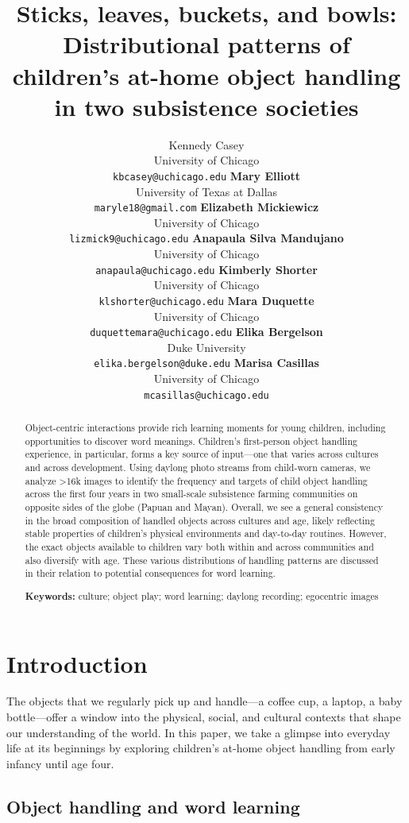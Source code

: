 \documentclass[10pt, letterpaper]{article}
\title{Sticks, leaves, buckets, and bowls: Distributional patterns of
children's at-home object handling in two subsistence societies}
\author{Kennedy Casey \\
        University of Chicago \\
        \texttt{\small{kbcasey@uchicago.edu}}
\And \textbf{Mary Elliott} \\
             University of Texas at Dallas \\
             \texttt{\small{maryle18@gmail.com}}
\And \textbf{Elizabeth Mickiewicz} \\
             University of Chicago \\
             \texttt{\small{lizmick9@uchicago.edu}}    
\And \textbf{Anapaula Silva Mandujano} \\
             University of Chicago \\
             \texttt{\small{anapaula@uchicago.edu}}   
\AND \textbf{Kimberly Shorter} \\
             University of Chicago \\
             \texttt{\small{klshorter@uchicago.edu}}
\And \textbf{Mara Duquette} \\
             University of Chicago \\
             \texttt{\small{duquettemara@uchicago.edu}}
\And \textbf{Elika Bergelson} \\
             Duke University \\
             \texttt{\small{elika.bergelson@duke.edu}}
\And \textbf{Marisa Casillas} \\
             University of Chicago \\
             \texttt{\small{mcasillas@uchicago.edu}}}
\begin{document}
\maketitle

\begin{abstract}
Object-centric interactions provide rich learning moments for young
children, including opportunities to discover word meanings. Children's
first-person object handling experience, in particular, forms a key
source of input---one that varies across cultures and across
development. Using daylong photo streams from child-worn cameras, we
analyze \textgreater16k images to identify the frequency and targets of
child object handling across the first four years in two small-scale
subsistence farming communities on opposite sides of the globe (Papuan
and Mayan). Overall, we see a general consistency in the broad
composition of handled objects across cultures and age, likely
reflecting stable properties of children's physical environments and
day-to-day routines. However, the exact objects available to children
vary both within and across communities and also diversify with age.
These various distributions of handling patterns are discussed in their
relation to potential consequences for word learning.

\textbf{Keywords:}
culture; object play; word learning; daylong recording; egocentric
images
\end{abstract}

\hypertarget{introduction}{%
\section{Introduction}\label{introduction}}

The objects that we regularly pick up and handle---a coffee cup, a
laptop, a baby bottle---offer a window into the physical, social, and
cultural contexts that shape our understanding of the world. In this
paper, we take a glimpse into everyday life at its beginnings by
exploring children's at-home object handling from early infancy until
age four.

\hypertarget{object-handling-and-word-learning}{%
\subsection{Object handling and word
learning}\label{object-handling-and-word-learning}}
\end{document}
